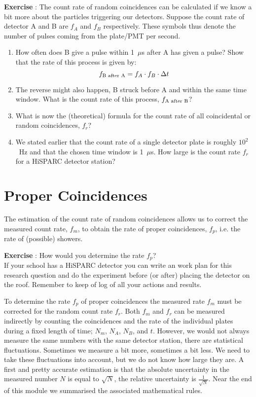 \begin{shaded}
\textbf{Exercise \theExercise {}} : The count rate of random coincidences can be calculated if we know a bit more about the particles triggering our detectors. Suppose the count rate of detector A and B are $f_A$ and $f_B$ respectively. These symbols thus denote the number of pulses coming from the plate/PMT per second.
\begin{enumerate}[-]
\item How often does B give a pulse within 1~$\mu$s after A has given a pulse? Show that the rate of this process is given by:
\begin{equation}
f_{\mbox{\scriptsize{B after A}}} = f_A \cdot f_B \cdot \Delta t
\end{equation}
\item The reverse might also happen, B struck before A and within the same time window. What is the count rate of this process, $f_{\mbox{\scriptsize{A after B}}}$?
\item What is now the (theoretical) formula for the count rate of all coincidental or random coincidences, $f_r$?
\item We stated earlier that the count rate of a single detector plate is roughly $10^2$~Hz and that the chosen time window is 1~$\mu$s. How large is the count rate $f_r$ for a HiSPARC detector station?
\end{enumerate}\end{shaded}

\section{Proper Coincidences}
The estimation of the count rate of random coincidences allows us to correct the measured count rate, $f_m$, to obtain the rate of proper coincidences, $f_p$, i.e. the rate of (possible) showers.

\begin{shaded}
\textbf{Exercise \theExercise {}} : How would you determine the rate $f_p$? \\
If your school has a HiSPARC detector you can write an work plan for this research question and do the experiment before (or after) placing the detector on the roof. Remember to keep of log of all your actions and results.\end{shaded}

To determine the rate $f_p$ of proper coincidences the measured rate $f_m$ must be corrected for the random count rate $f_r$. Both $f_m$ and $f_r$ can be measured indirectly by counting the coincidences and the rate of the individual plates during a fixed length of time; $N_m$, $N_A$, $N_B$, and $t$. However, we would not always measure the same numbers with the same detector station, there are statistical fluctuations. Sometimes we measure a bit more, sometimes a bit less. We need to take these fluctuations into account, but we do not know how large they are. A first and pretty accurate estimation is that the absolute uncertainty in the measured number $N$ is equal to $\sqrt{N}$, the relative uncertainty is $\frac{1}{\sqrt{N}}$. Near the end of this module we summarised the associated mathematical rules. 


